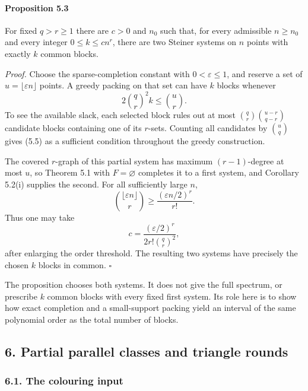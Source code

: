 \documentclass[english,11pt,a4paper]{article}
\begin{document}
\par
\begin{samepage}
\paragraph{Proposition 5.3}\label{proposition-5.3}

For fixed \(q>r\ge1\) there are \(c>0\) and \(n_0\) such that, for every admissible \(n\ge n_0\) and every integer \(0\le k\le c n^r\), there are two Steiner systems on \(n\) points with exactly \(k\) common blocks.

\end{samepage}
\emph{Proof.} Choose the sparse-completion constant with \(0<\varepsilon\le1\), and reserve a set of \(u=\lfloor\varepsilon n\rfloor\) points. A greedy packing on that set can have \(k\) blocks whenever \[2\binom qr^2 k\le\binom ur.
\tag{5.5}\] To see the available slack, each selected block rules out at most \(\binom qr\binom{u-r}{q-r}\) candidate blocks containing one of its \(r\)-sets. Counting all candidates by \(\binom uq\) gives (5.5) as a sufficient condition throughout the greedy construction.

The covered \(r\)-graph of this partial system has maximum \((r-1)\)-degree at most \(u\), so Theorem 5.1 with \(F=\varnothing\) completes it to a first system, and Corollary 5.2(i) supplies the second. For all sufficiently large \(n\), \[\binom{\lfloor\varepsilon n\rfloor}{r}
\ge\frac{(\varepsilon n/2)^r}{r!}.\] Thus one may take \[c=\frac{(\varepsilon/2)^r}{2r!\binom qr^2},
\tag{5.6}\] after enlarging the order threshold. The resulting two systems have precisely the chosen \(k\) blocks in common. \(\square\)

The proposition chooses both systems. It does not give the full spectrum, or prescribe \(k\) common blocks with every fixed first system. Its role here is to show how exact completion and a small-support packing yield an interval of the same polynomial order as the total number of blocks.

\subsection{6. Partial parallel classes and triangle rounds}\label{partial-parallel-classes-and-triangle-rounds}


\subsubsection{6.1. The colouring input}\label{the-colouring-input}
\end{document}
